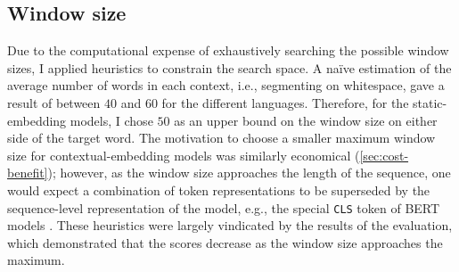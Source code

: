 \subsection{Window size}

Due to the computational expense of exhaustively searching the possible window sizes, I
applied heuristics to constrain the search space.
A naïve estimation of the average number of words in each context, i.e., segmenting on
whitespace, gave a result of between $40$ and $60$ for the different languages.
Therefore, for the static-embedding models, I chose $50$ as an upper bound on the
window size on either side of the target word.
The motivation to choose a smaller maximum window size for contextual-embedding models
was similarly economical (\cref{sec:cost-benefit}); however, as the window size
approaches the length of the sequence, one would expect a combination of token
representations to be superseded by the sequence-level representation of the model,
e.g., the special \texttt{CLS} token of BERT models \parencite[4174]{Devlin2019}.
These heuristics were largely vindicated by the results of the evaluation, which
demonstrated that the scores decrease as the window size approaches the maximum.
